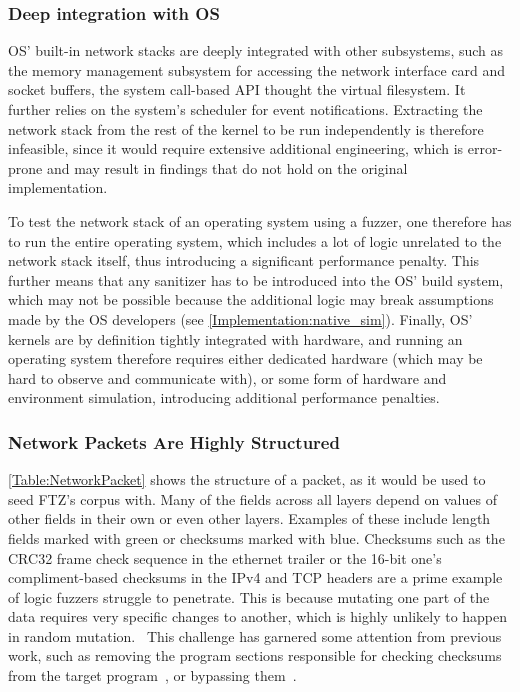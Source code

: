\documentclass[twocolumn]{article}
\newcommand{\proj}{FTZ\xspace}
\let\savedCite=\cite
\renewcommand{\cite}{\unskip~\savedCite}
\begin{document}
\subsubsection{Deep integration with OS}

OS' built-in network stacks are deeply integrated with other subsystems, such as the memory management subsystem for accessing the network interface card and socket buffers, the system call-based API thought the virtual filesystem. It further relies on the system's scheduler for event notifications. Extracting the network stack from the rest of the kernel to be run independently is therefore infeasible, since it would require extensive additional engineering, which is error-prone and may result in findings that do not hold on the original implementation.\cite{KernelVsUserNetworking}

To test the network stack of an operating system using a fuzzer, one therefore has to run the entire operating system, which includes a lot of logic unrelated to the network stack itself, thus introducing a significant performance penalty. This further means that any sanitizer has to be introduced into the OS' build system, which may not be possible because the additional logic may break assumptions made by the OS developers (see \cref{Implementation:native_sim}). Finally, OS' kernels are by definition tightly integrated with hardware, and running an operating system therefore requires either dedicated hardware (which may be hard to observe and communicate with), or some form of hardware and environment simulation, introducing additional performance penalties.

\subsubsection{Network Packets Are Highly Structured}
\label{Background:TcpIsStructured}

\cref{Table:NetworkPacket} shows the structure of a packet, as it would be used to seed \proj's corpus with. Many of the fields across all layers depend on values of other fields in their own or even other layers. Examples of these include length fields marked with green or checksums marked with blue. Checksums such as the CRC32 frame check sequence in the ethernet trailer or the 16-bit one's compliment-based checksums in the IPv4 and TCP headers are a prime example of logic fuzzers struggle to penetrate. This is because mutating one part of the data requires very specific changes to another, which is highly unlikely to happen in random mutation.\cite{StateOfTheArt} This challenge has garnered some attention from previous work, such as removing the program sections responsible for checking checksums from the target program\cite{TFuzz}, or bypassing them\cite{REDQUEEN}.
\end{document}
